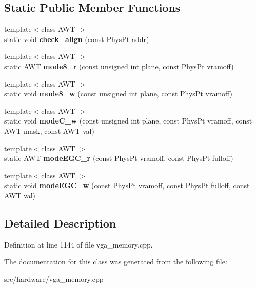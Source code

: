 \subsection*{Static Public Member Functions}
\begin{DoxyCompactItemize}
\item 
\hypertarget{classVGA__PC98__PageHandler_ad0cab17b7f08ec55aea9fa00c6154ef5}{{\footnotesize template$<$class A\-W\-T $>$ }\\static void {\bfseries check\-\_\-align} (const Phys\-Pt addr)}\label{classVGA__PC98__PageHandler_ad0cab17b7f08ec55aea9fa00c6154ef5}

\item 
\hypertarget{classVGA__PC98__PageHandler_a258b7ab8e0bf52a16e15c16ab0811670}{{\footnotesize template$<$class A\-W\-T $>$ }\\static A\-W\-T {\bfseries mode8\-\_\-r} (const unsigned int plane, const Phys\-Pt vramoff)}\label{classVGA__PC98__PageHandler_a258b7ab8e0bf52a16e15c16ab0811670}

\item 
\hypertarget{classVGA__PC98__PageHandler_a64b218e643644a33e0c298622dbe72b9}{{\footnotesize template$<$class A\-W\-T $>$ }\\static void {\bfseries mode8\-\_\-w} (const unsigned int plane, const Phys\-Pt vramoff)}\label{classVGA__PC98__PageHandler_a64b218e643644a33e0c298622dbe72b9}

\item 
\hypertarget{classVGA__PC98__PageHandler_ad50a2f65155811c9398c8c17ccf65fb1}{{\footnotesize template$<$class A\-W\-T $>$ }\\static void {\bfseries mode\-C\-\_\-w} (const unsigned int plane, const Phys\-Pt vramoff, const A\-W\-T mask, const A\-W\-T val)}\label{classVGA__PC98__PageHandler_ad50a2f65155811c9398c8c17ccf65fb1}

\item 
\hypertarget{classVGA__PC98__PageHandler_a12e4eba4a8b70a108fa7623c3333043e}{{\footnotesize template$<$class A\-W\-T $>$ }\\static A\-W\-T {\bfseries mode\-E\-G\-C\-\_\-r} (const Phys\-Pt vramoff, const Phys\-Pt fulloff)}\label{classVGA__PC98__PageHandler_a12e4eba4a8b70a108fa7623c3333043e}

\item 
\hypertarget{classVGA__PC98__PageHandler_aea2664bee908ecf657cb3d114303d867}{{\footnotesize template$<$class A\-W\-T $>$ }\\static void {\bfseries mode\-E\-G\-C\-\_\-w} (const Phys\-Pt vramoff, const Phys\-Pt fulloff, const A\-W\-T val)}\label{classVGA__PC98__PageHandler_aea2664bee908ecf657cb3d114303d867}

\end{DoxyCompactItemize}


\subsection{Detailed Description}


Definition at line 1144 of file vga\-\_\-memory.\-cpp.



The documentation for this class was generated from the following file\-:\begin{DoxyCompactItemize}
\item 
src/hardware/vga\-\_\-memory.\-cpp\end{DoxyCompactItemize}
